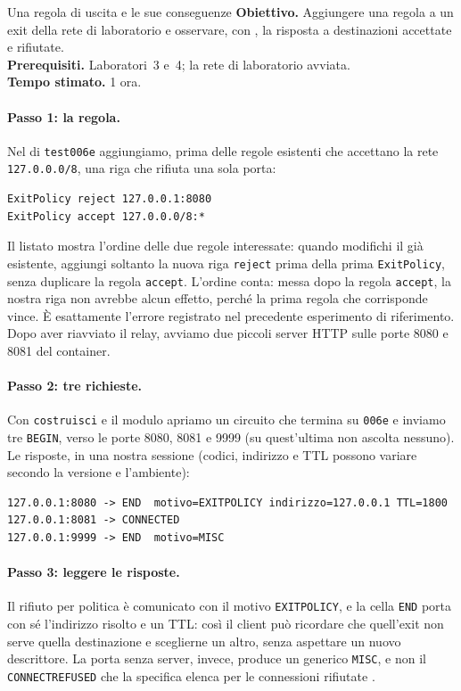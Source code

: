 \begin{laboratorio}[14]{Una regola di uscita e le sue conseguenze}
\textbf{Obiettivo.} Aggiungere una regola a un exit della rete di laboratorio e osservare, con , la risposta a destinazioni accettate e rifiutate.\\
\textbf{Prerequisiti.} Laboratori~3 e~4; la rete di laboratorio avviata.\\
\textbf{Tempo stimato.} 1 ora.
\end{laboratorio}

\paragraph{Passo 1: la regola.} Nel  di \texttt{test006e} aggiungiamo, prima delle regole esistenti che accettano la rete \texttt{127.0.0.0/8}, una riga che rifiuta una sola porta:
\begin{lstlisting}[numbers=none]
ExitPolicy reject 127.0.0.1:8080
ExitPolicy accept 127.0.0.0/8:*
\end{lstlisting}
Il listato mostra l'ordine delle due regole interessate: quando modifichi il  già esistente, aggiungi soltanto la nuova riga \texttt{reject} prima della prima \texttt{ExitPolicy}, senza duplicare la regola \texttt{accept}. L'ordine conta: messa dopo la regola \texttt{accept}, la nostra riga non avrebbe alcun effetto, perché la prima regola che corrisponde vince. È esattamente l'errore registrato nel precedente esperimento di riferimento. Dopo aver riavviato il relay, avviamo due piccoli server HTTP sulle porte 8080 e 8081 del container.

\paragraph{Passo 2: tre richieste.} Con \texttt{costruisci} e il modulo  apriamo un circuito che termina su \texttt{006e} e inviamo tre \texttt{BEGIN}, verso le porte 8080, 8081 e 9999 (su quest'ultima non ascolta nessuno). Le risposte, in una nostra sessione (codici, indirizzo e TTL possono variare secondo la versione e l'ambiente):
\begin{lstlisting}[numbers=none]
127.0.0.1:8080 -> END  motivo=EXITPOLICY indirizzo=127.0.0.1 TTL=1800
127.0.0.1:8081 -> CONNECTED
127.0.0.1:9999 -> END  motivo=MISC
\end{lstlisting}

\paragraph{Passo 3: leggere le risposte.} Il rifiuto per politica è comunicato con il motivo \texttt{EXITPOLICY}, e la cella \texttt{END} porta con sé l'indirizzo risolto e un TTL: così il client può ricordare che quell'exit non serve quella destinazione e sceglierne un altro, senza aspettare un nuovo descrittore. La porta senza server, invece, produce un generico \texttt{MISC}, e non il \texttt{CONNECTREFUSED} che la specifica elenca per le connessioni rifiutate .

